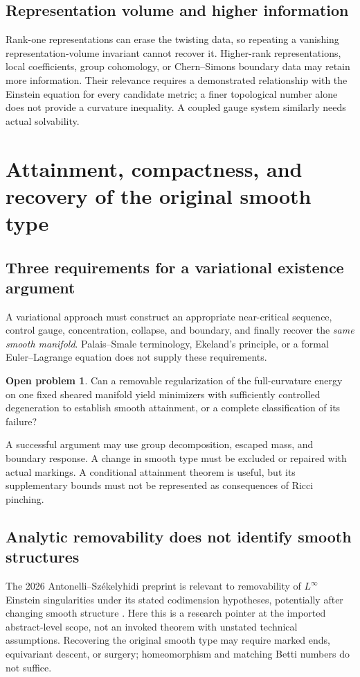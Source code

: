 \documentclass[11pt]{article}
\theoremstyle{definition}\newtheorem{problem}[theorem]{Open problem}
\theoremstyle{remark}\newtheorem{remark}[theorem]{Scope}
\numberwithin{equation}{section}
\begin{document}
\subsection{Representation volume and higher information}\label{sec:higher-information}
Rank-one representations can erase the twisting data, so repeating a vanishing representation-volume invariant cannot recover it. Higher-rank representations, local coefficients, group cohomology, or Chern--Simons boundary data may retain more information. Their relevance requires a demonstrated relationship with the Einstein equation for every candidate metric; a finer topological number alone does not provide a curvature inequality. A coupled gauge system similarly needs actual solvability.

\section{Attainment, compactness, and recovery of the original smooth type}\label{sec:attainment}
\subsection{Three requirements for a variational existence argument}\label{sec:three-requirements}
A variational approach must construct an appropriate near-critical sequence, control gauge, concentration, collapse, and boundary, and finally recover the \emph{same smooth manifold}. Palais--Smale terminology, Ekeland's principle, or a formal Euler--Lagrange equation does not supply these requirements.
\begin{problem}
Can a removable regularization of the full-curvature energy on one fixed sheared manifold yield minimizers with sufficiently controlled degeneration to establish smooth attainment, or a complete classification of its failure?
\end{problem}
A successful argument may use group decomposition, escaped mass, and boundary response. A change in smooth type must be excluded or repaired with actual markings. A conditional attainment theorem is useful, but its supplementary bounds must not be represented as consequences of Ricci pinching.

\subsection{Analytic removability does not identify smooth structures}\label{sec:removability}
The 2026 Antonelli--Sz\'ekelyhidi preprint is relevant to removability of $L^\infty$ Einstein singularities under its stated codimension hypotheses, potentially after changing smooth structure \cite{AS}. Here this is a research pointer at the imported abstract-level scope, not an invoked theorem with unstated technical assumptions. Recovering the original smooth type may require marked ends, equivariant descent, or surgery; homeomorphism and matching Betti numbers do not suffice.
\end{document}
